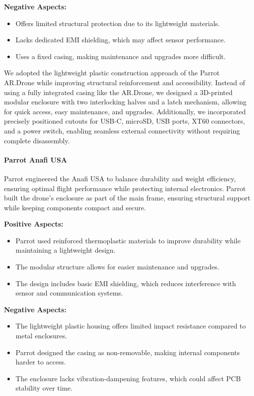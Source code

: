 \documentclass[12pt]{article}
\begin{document}
\textbf{Negative Aspects:}
\begin{itemize}
    \item Offers limited structural protection due to its lightweight materials.
    \item Lacks dedicated EMI shielding, which may affect sensor performance.
    \item Uses a fixed casing, making maintenance and upgrades more difficult.
\end{itemize}

\par We adopted the lightweight plastic construction approach of the Parrot AR.Drone while improving structural reinforcement and accessibility. Instead of using a fully integrated casing like the AR.Drone, we designed a 3D-printed modular enclosure with two interlocking halves and a latch mechanism, allowing for quick access, easy maintenance, and upgrades. Additionally, we incorporated precisely positioned cutouts for USB-C, microSD, USB ports, XT60 connectors, and a power switch, enabling seamless external connectivity without requiring complete disassembly.

\paragraph{Parrot Anafi USA}

\par Parrot engineered the Anafi USA to balance durability and weight efficiency, ensuring optimal flight performance while protecting internal electronics. Parrot built the drone’s enclosure as part of the main frame, ensuring structural support while keeping components compact and secure.

\textbf{Positive Aspects:}
\begin{itemize}
    \item Parrot used reinforced thermoplastic materials to improve durability while maintaining a lightweight design.
    \item The modular structure allows for easier maintenance and upgrades.
    \item The design includes basic EMI shielding, which reduces interference with sensor and communication systems.
\end{itemize}

\textbf{Negative Aspects:}
\begin{itemize}
    \item The lightweight plastic housing offers limited impact resistance compared to metal enclosures.
    \item Parrot designed the casing as non-removable, making internal components harder to access.
    \item The enclosure lacks vibration-dampening features, which could affect PCB stability over time.
\end{itemize}
\end{document}
